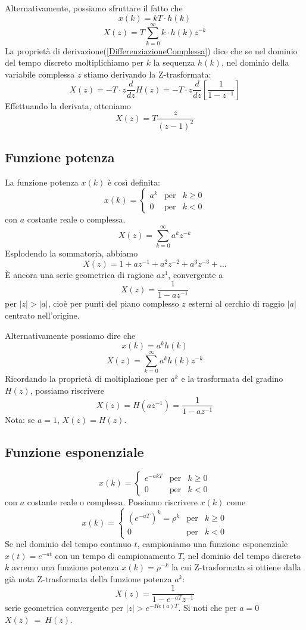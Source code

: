 \documentclass[a4paper]{report}
\begin{document}
Alternativamente, possiamo sfruttare il fatto che
\[
x(k) = kT \cdot h(k)
\]
\[
X(z) = T\sum_{k=0}^{\infty} k \cdot h(k) z^{-k}
\]
La propriet\`a di derivazione(\ref{DifferenziazioneComplessa}) dice
che se nel dominio del tempo discreto moltiplichiamo per $k$ la
sequenza $h(k)$, nel dominio della variabile complessa $z$ stiamo
derivando la Z-trasformata:
\[
X(z) = -T \cdot z \dfrac{d}{dz} H(z) = -T \cdot z \dfrac{d}{dz} \left[
 \dfrac{1}{1 - z^{-1}}\right]
\]
Effettuando la derivata, otteniamo
\[
X(z) = T \dfrac{z}{(z - 1)^2}
\]

\subsection{Funzione potenza}
La funzione potenza $x(k)$ \`e cos\`i definita:
\[
x(k) =
\left\{
\begin{array}{lll}
  a^k & \textrm{per} & k \geq 0\\
  0 & \textrm{per} & k < 0
\end{array}
\right.
\]
con $a$ costante reale o complessa.
\[
X(z) = \sum_{k=0}^{\infty} a^k z^{-k}
\]
Esplodendo la sommatoria, abbiamo
\[
X(z) = 1 + az^{-1} + a^2 z^{-2} + a^3 z^{-3} + ...
\]
\`E ancora una serie geometrica di ragione $az^{1}$, convergente a
\[
X(z) = \dfrac{1}{1 - az^{-1}}
\]
per $|z| > |a|$, cio\`e per punti del piano complesso $z$ esterni al
cerchio di raggio $|a|$ centrato nell'origine.

Alternativamente possiamo dire che
\[
x(k) = a^k h(k)
\]
\[
X(z) = \sum_{k=0}^{\infty} a^k h(k)z^{-k}
\]
Ricordando la propriet\`a di moltiplazione per $a^k$ e la trasformata
del gradino $H(z)$, possiamo riscrivere
\[
X(z) = H(az^{-1}) = \dfrac{1}{1 - az^{-1}}
\]
Nota: se $a = 1$, $X(z) = H(z)$.

\subsection{Funzione esponenziale}
\[
x(k) =
\left\{
\begin{array}{lll}
  e^{-akT} & \textrm{per} & k \geq 0\\
  0 & \textrm{per} & k < 0
\end{array}
\right.
\]
con $a$ costante reale o complessa. Possiamo riscrivere $x(k)$ come
\[
x(k) =
\left\{
\begin{array}{lll}
  (e^{-aT})^k = \rho^k & \textrm{per} & k \geq 0\\
  0 & \textrm{per} & k < 0
\end{array}
\right.
\]
Se nel dominio del tempo continuo $t$, campioniamo una funzione
esponenziale $x(t) = e^{-at}$ con un tempo di campionamento $T$, nel
dominio del tempo discreto $k$ avremo una funzione potenza $x(k) =
\rho^{-k}$ la cui Z-trasformata si ottiene dalla gi\`a nota
Z-trasformata della funzione potenza $a^k$:
\[
X(z) = \dfrac{1}{1 - e^{-aT}z^{-1}}
\]
serie geometrica convergente per $|z| > e^{-Re(a)T}$. Si noti che per
$a = 0$ $X(z)~=~H(z)$.
\end{document}
